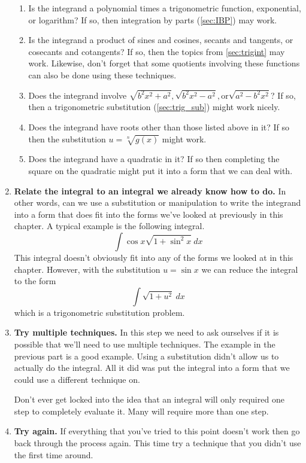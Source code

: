 \begin{enumerate}
\begin{enumerate}
\item Is the integrand a polynomial times a trigonometric function, exponential, or logarithm? If so, then integration by parts (\autoref{sec:IBP}) may work.

\item Is the integrand a product of sines and cosines, secants and tangents, or cosecants and cotangents? If so, then the topics from \autoref{sec:trigint} may work. Likewise, don't forget that some quotients involving these functions can also be done using these techniques.

\item Does the integrand involve $\sqrt {b^2x^2 + a^2}, \sqrt {b^2x^2 - a^2}, \text{or} \sqrt { a^2-b^2x^2}$? If so, then a trigonometric substitution (\autoref{sec:trig_sub}) might work nicely.

\item Does the integrand have roots other than those listed above in it? If so then the substitution $u=\sqrt[n]{g(x)}$ might work.

\item Does the integrand have a quadratic in it? If so then completing the square on the quadratic might put it into a form that we can deal with. 
\end{enumerate}

\item \textbf{Relate the integral to an integral we already know how to do.} In other words, can we use a substitution or manipulation to write the integrand into a  form that does fit into the forms we've looked at previously in this chapter. A typical example is the following integral.$$\int \cos x\sqrt{1 + \sin^2 x}\ dx$$
This integral doesn't obviously fit into any of the forms we looked at in this chapter. However, with the substitution $u = \sin x$ we can reduce the integral to the form $$\int \sqrt{1+u^2}\ dx$$ which is a trigonometric substitution problem.

\item \textbf{Try multiple techniques.} In this step we need to ask ourselves if it is possible that we'll need to use multiple techniques. The example in the previous part is a good example. Using a substitution didn't allow us to actually do the integral. All it did was put the integral into a form that we could use a different technique on.

Don't ever get locked into the idea that an integral will only required one step to completely evaluate it. Many will require more than one step.

\item \textbf{Try again.} If everything that you've tried to this point doesn't work then go back through the process again. This time try a technique that you didn't use the first time around.
\end{enumerate}

